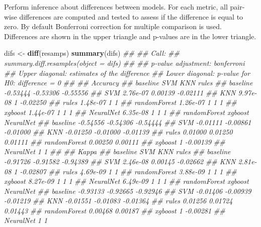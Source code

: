 \documentclass[
  notitlepage]{book}
\newenvironment{Shaded}{\begin{snugshade}}{\end{snugshade}}
\newcommand{\CommentTok}[1]{\textcolor[rgb]{0.56,0.35,0.01}{\textit{#1}}}
\newcommand{\KeywordTok}[1]{\textcolor[rgb]{0.13,0.29,0.53}{\textbf{#1}}}
\newcommand{\NormalTok}[1]{#1}
\newcommand{\StringTok}[1]{\textcolor[rgb]{0.31,0.60,0.02}{#1}}
\begin{document}
Perform inference about differences between models. For each metric, all
pair-wise differences are computed and tested to assess if the
difference is equal to zero. By default Bonferroni correction for
multiple comparison is used. Differences are shown in the upper triangle
and p-values are in the lower triangle.

\begin{Shaded}
\begin{Highlighting}[]
\NormalTok{difs \textless{}{-}}\StringTok{ }\KeywordTok{diff}\NormalTok{(resamps)}
\KeywordTok{summary}\NormalTok{(difs)}
\CommentTok{\#\# }
\CommentTok{\#\# Call:}
\CommentTok{\#\# summary.diff.resamples(object = difs)}
\CommentTok{\#\# }
\CommentTok{\#\# p{-}value adjustment: bonferroni }
\CommentTok{\#\# Upper diagonal: estimates of the difference}
\CommentTok{\#\# Lower diagonal: p{-}value for H0: difference = 0}
\CommentTok{\#\# }
\CommentTok{\#\# Accuracy }
\CommentTok{\#\#              baseline SVM      KNN      rules   }
\CommentTok{\#\# baseline              {-}0.53444 {-}0.53306 {-}0.55556}
\CommentTok{\#\# SVM          2.76e{-}07           0.00139 {-}0.02111}
\CommentTok{\#\# KNN          9.97e{-}08 1                 {-}0.02250}
\CommentTok{\#\# rules        1.48e{-}07 1        1                }
\CommentTok{\#\# randomForest 1.26e{-}07 1        1        1       }
\CommentTok{\#\# xgboost      1.44e{-}07 1        1        1       }
\CommentTok{\#\# NeuralNet    6.35e{-}08 1        1        1       }
\CommentTok{\#\#              randomForest xgboost  NeuralNet}
\CommentTok{\#\# baseline     {-}0.54556     {-}0.54306 {-}0.54444 }
\CommentTok{\#\# SVM          {-}0.01111     {-}0.00861 {-}0.01000 }
\CommentTok{\#\# KNN          {-}0.01250     {-}0.01000 {-}0.01139 }
\CommentTok{\#\# rules         0.01000      0.01250  0.01111 }
\CommentTok{\#\# randomForest               0.00250  0.00111 }
\CommentTok{\#\# xgboost      1                     {-}0.00139 }
\CommentTok{\#\# NeuralNet    1            1                 }
\CommentTok{\#\# }
\CommentTok{\#\# Kappa }
\CommentTok{\#\#              baseline SVM      KNN      rules   }
\CommentTok{\#\# baseline              {-}0.91726 {-}0.91582 {-}0.94389}
\CommentTok{\#\# SVM          2.46e{-}08           0.00145 {-}0.02662}
\CommentTok{\#\# KNN          2.81e{-}08 1                 {-}0.02807}
\CommentTok{\#\# rules        4.69e{-}09 1        1                }
\CommentTok{\#\# randomForest 3.88e{-}09 1        1        1       }
\CommentTok{\#\# xgboost      8.27e{-}09 1        1        1       }
\CommentTok{\#\# NeuralNet    6.49e{-}09 1        1        1       }
\CommentTok{\#\#              randomForest xgboost  NeuralNet}
\CommentTok{\#\# baseline     {-}0.93133     {-}0.92665 {-}0.92946 }
\CommentTok{\#\# SVM          {-}0.01406     {-}0.00939 {-}0.01219 }
\CommentTok{\#\# KNN          {-}0.01551     {-}0.01083 {-}0.01364 }
\CommentTok{\#\# rules         0.01256      0.01724  0.01443 }
\CommentTok{\#\# randomForest               0.00468  0.00187 }
\CommentTok{\#\# xgboost      1                     {-}0.00281 }
\CommentTok{\#\# NeuralNet    1            1}
\end{Highlighting}
\end{Shaded}
\end{document}
